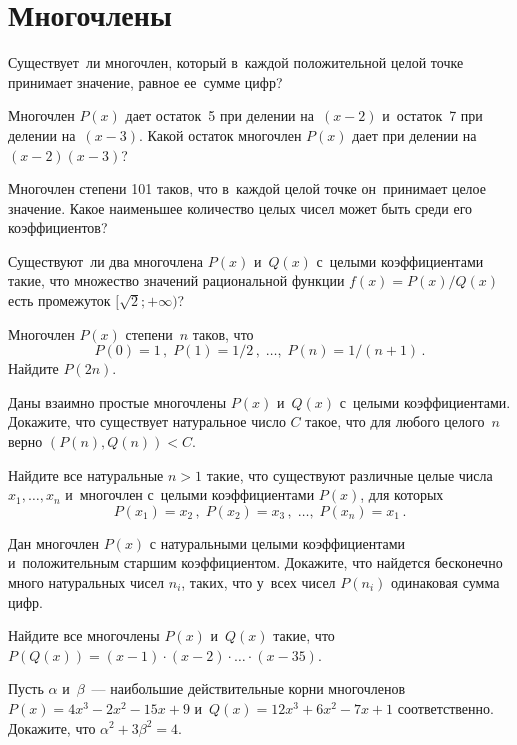 
\section*{Многочлены}


\begin{problems}

\item
Существует~ли многочлен, который в~каждой положительной целой точке принимает
значение, равное ее~сумме цифр?

\item
Многочлен $P(x)$ дает остаток~5 при делении на~$(x - 2)$ и~остаток~7
при делении на~$(x - 3)$.
Какой остаток многочлен $P(x)$ дает при делении на~$(x - 2) (x - 3)$?

\item
Многочлен степени 101 таков, что в~каждой целой точке он~принимает целое
значение.
Какое наименьшее количество целых чисел может быть среди его коэффициентов?

\item
Существуют~ли два многочлена $P(x)$ и~$Q(x)$ с~целыми коэффициентами такие, что
множество значений рациональной функции $f(x) = P(x) / Q(x)$ есть
промежуток $[\sqrt{2}; +\infty)$?

\item
Многочлен $P(x)$ степени~$n$ таков, что
\[
    P(0) = 1
\,,\;
    P(1) = 1 / 2
\,,\;
    \ldots
,\;
    P(n) = 1 / (n + 1)
\,.\]
Найдите $P(2n)$.

\item
Даны взаимно простые многочлены $P(x)$ и~$Q(x)$ с~целыми коэффициентами.
Докажите, что существует натуральное число $C$ такое, что для любого целого~$n$
верно $(P(n), Q(n)) < C$.

\item
Найдите все натуральные $n > 1$ такие, что существуют различные целые числа
$x_1, \ldots, x_n$ и~многочлен с~целыми коэффициентами $P(x)$, для которых
\[
    P(x_1) = x_2
\,,\;
    P(x_2) = x_3
\,,\;
    \ldots
,\;
    P(x_n)=x_1
\, . \]

\item
Дан многочлен $P(x)$ с\quad
\subproblem натуральными
\quad
\subproblem целыми
\quad
коэффициентами и~положительным старшим коэффициентом.
Докажите, что найдется бесконечно много натуральных чисел $n_i$, таких, что
у~всех чисел $P(n_i)$ одинаковая сумма цифр.

\item
Найдите все многочлены $P(x)$ и~$Q(x)$ такие, что
$P(Q(x)) = (x - 1) \cdot (x - 2) \cdot \ldots \cdot (x - 35)$.

\item
Пусть $\alpha$ и~$\beta$~--- наибольшие действительные корни многочленов
$P(x) = 4 x^3 - 2 x^2 - 15 x + 9$ и~$Q(x) = 12 x^3 + 6 x^2 - 7 x + 1$
соответственно.
Докажите, что $\alpha^2 + 3 \beta^2 = 4$.

\end{problems}

